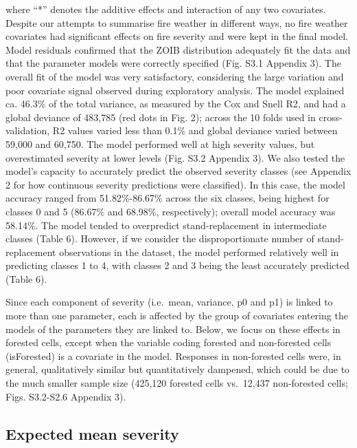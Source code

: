 \documentclass[
  numafflabel,
  authoryear,
  preprint]{elsarticle}
\begin{document}
where ``*'' denotes the additive effects and interaction of any two
covariates. Despite our attempts to summarise fire weather in different
ways, no fire weather covariates had significant effects on fire
severity and were kept in the final model. Model residuals confirmed
that the ZOIB distribution adequately fit the data and that the
parameter models were correctly specified (Fig. S3.1 Appendix 3). The
overall fit of the model was very satisfactory, considering the large
variation and poor covariate signal observed during exploratory
analysis. The model explained ca. 46.3\% of the total variance, as
measured by the Cox and Snell R2, and had a global deviance of 483,785
(red dots in Fig. 2); across the 10 folds used in cross-validation, R2
values varied less than 0.1\% and global deviance varied between 59,000
and 60,750. The model performed well at high severity values, but
overestimated severity at lower levels (Fig. S3.2 Appendix 3). We also
tested the model's capacity to accurately predict the observed severity
classes (see Appendix 2 for how continuous severity predictions were
classified). In this case, the model accuracy ranged from
51.82\%-86.67\% across the six classes, being highest for classes 0 and
5 (86.67\% and 68.98\%, respectively); overall model accuracy was
58.14\%. The model tended to overpredict stand-replacement in
intermediate classes (Table 6). However, if we consider the
disproportionate number of stand-replacement observations in the
dataset, the model performed relatively well in predicting classes 1 to
4, with classes 2 and 3 being the least accurately predicted (Table 6).

Since each component of severity (i.e.~mean, variance, p0 and p1) is
linked to more than one parameter, each is affected by the group of
covariates entering the models of the parameters they are linked to.
Below, we focus on these effects in forested cells, except when the
variable coding forested and non-forested cells (isForested) is a
covariate in the model. Responses in non-forested cells were, in
general, qualitatively similar but quantitatively dampened, which could
be due to the much smaller sample size (425,120 forested cells
vs.~12,437 non-forested cells; Figs. S3.2-S2.6 Appendix 3).

\subsection{Expected mean severity}\label{expected-mean-severity}
\end{document}
